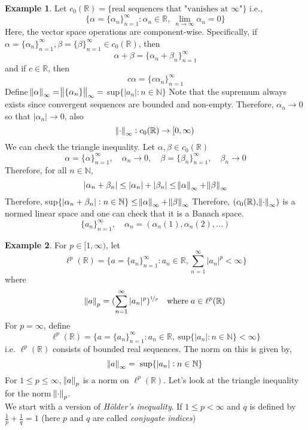 \documentclass[a4paper, 11pt]{book}
\theoremstyle{definition}
\newtheorem*{example}{Example}
\theoremstyle{remark}
\begin{document}
    \begin{example}
        Let $c_0(\mathbb{R}) = \{\text{real sequences that "vanishes at $\infty$"}\}$ i.e.,
        \[  \{\alpha=\{\alpha_n\}_{n=1}^{\infty}: \alpha_n\in\mathbb{R},\:\lim_{n\to\infty} \alpha_n = 0\} \]
        Here, the vector space operations are component-wise. Specifically, if $\alpha = \{\alpha_n\}_{n=1}^{\infty},
        \beta = \{\beta\}_{n=1}^{\infty} \in c_0(\mathbb{R})$, then
        \[ \alpha + \beta = \{\alpha_n+\beta_n\}_{n=1}^{\infty} \]
        and if $c\in\mathbb{R}$, then
        \[ c\alpha = \{c\alpha_n\}_{n=1}^{\infty} \]
        Define $\norm{\alpha}_{\infty} = \norm{\{\alpha_n\}}_{\infty} =$ sup$\{|a_n|:n\in\mathbb{N}\}$
        Note that the supremum always exists since convergent sequences are bounded and non-empty. Therefore, $\alpha_n\to0$ so that
        $|\alpha_n|\to0$, also
        \[ \norm{\cdot}_{\infty}: c_0(\mathbb{R}) \to [0,\infty) \]
        We can check the triangle inequality. Let $\alpha,\beta\in c_0(\mathbb{R})$
        \[ \alpha = \{\alpha\}_{n=1}^{\infty}, \quad\alpha_n\to0, \quad\beta = \{\beta_n\}_{n=1}^{\infty}, \quad\beta_n\to0 \]
        Therefore, for all $n\in\mathbb{N}$,
        \[ |\alpha_n + \beta_n| \leq |\alpha_n| + |\beta_n| \leq \norm{\alpha}_{\infty} + \norm{\beta}_{\infty} \]
        Therefore, sup$\{|\alpha_n + \beta_n|: n\in\mathbb{N}\} \leq \norm{\alpha}_{\infty} + \norm{\beta}_{\infty}$ 
        Therefore, $(c_0(\mathbb{R}),\norm{\cdot}_{\infty})$ is a normed linear space and one can check that it is a Banach space.
        \[ \{a_n\}_{n=1}^{\infty},\quad \alpha_n = (\alpha_n(1),\alpha_n(2), \hdots) \]
    \end{example}

    \begin{example}
        For $p\in[1,\infty)$, let 
        \[ \ell^p(\mathbb{R}) = \{ a = \{a_n\}_{n=1}^{\infty}: a_n\in\mathbb{R}, \sum_{n=1}^{\infty} |a_n|^p < \infty\} \]
        where
        \[ \norm{a}_p = (\sum_{n=1}^{\infty} |a_n|^p)^{\nicefrac{1}{p}}\quad\text{where}\; a\in\ell^p(\mathbb{R}) \]
        For $p=\infty$, define
        \[ \ell^p(\mathbb{R}) = \{ a = \{a_n\}_{n=1}^{\infty}: a_n\in\mathbb{R},\:\text{sup}\{|a_n|:n\in\mathbb{N}\} < \infty \} \]
        i.e. $\ell^p(\mathbb{R})$ consists of bounded real sequences. The norm on this is given by,
        \[ \norm{a}_{\infty} =\;\text{sup}\{|a_n|: n\in\mathbb{N}\} \]
        For $1\leq p\leq \infty$, $\norm{a}_p$ is a norm on $\ell^p(\mathbb{R})$. Let's look at the triangle inequality for
        the norm $\norm{\cdot}_p$.\\

        We start with a version of \textit{Hölder's inequality}. If $1\leq p<\infty$ and $q$ is defined by $\frac{1}{p}+\frac{1}{q}=1$
        (here $p$ and $q$ are called \textit{conjugate indices})
    \end{example}
\end{document}
